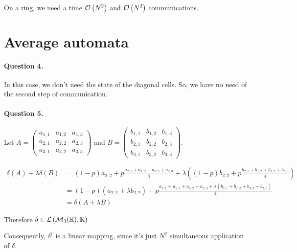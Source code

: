 On a ring, we need a time $\mathcal O \left( N^2 \right)$ and $\mathcal O \left( N^2 \right)$ communications.


\section{Average automata}

\paragraph{Question 4.}

In this case, we don't need the state of the diagonal cells. So, we have no need of the second step of communication.

\paragraph{Question 5.}

Let $A=
        \left(
            \begin{matrix}
                a_{1,1} & a_{1,2} & a_{1,3} \\ 
                a_{2,1} & a_{2,2} & a_{2,3} \\ 
                a_{3,1} & a_{3,2} & a_{3,3}
            \end{matrix}
        \right)$
         and 
    $B = 
        \left(
            \begin{matrix}
                b_{1,1} & b_{1,2} & b_{1,3} \\ 
                b_{2,1} & b_{2,2} & b_{2,3} \\ 
                b_{3,1} & b_{3,2} & b_{3,3}
            \end{matrix}
        \right)$.

$$
    \begin{aligned}
        \delta(A) + \lambda\delta(B) &= (1-p) a_{2,2} + p\frac{a_{2,1}+a_{1,2}+a_{3,2}+a_{2,3}}{4} + \lambda\left( (1-p) b_{2,2} + p\frac{b_{2,1}+b_{1,2}+b_{3,2}+b_{2,3}}{4} \right)\\
        &= (1-p) (a_{2,2} + \lambda b_{2,2}) + p\frac{a_{2,1}+a_{1,2}+a_{3,2}+a_{2,3} + \lambda (b_{2,1}+b_{1,2}+b_{3,2}+b_{2,3})}{4}\\
        &=\delta(A + \lambda B)
    \end{aligned}
$$

Therefore $\delta \in \mathcal{L}\left( \mathcal{M}_3(\mathbb{R}), \mathbb{R}\right)$

Consequently, $\delta^\dagger$ is a linear mapping, since it's just $N^2$ simultaneous application of $\delta$.

